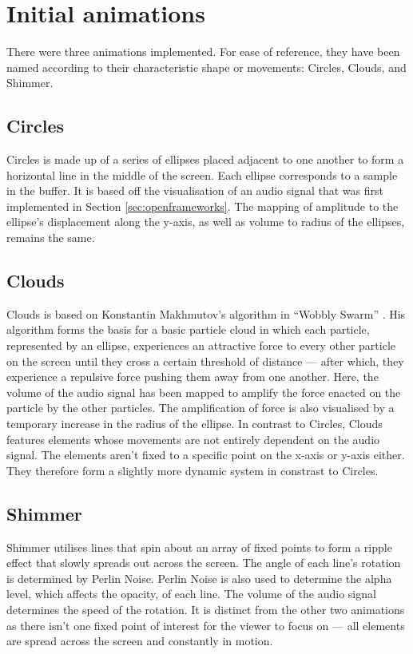 \documentclass[../initial_thesis.tex]{subfiles}
\begin{document}
\section{Initial animations}
There were three animations implemented. For ease of reference, they have been named according to their characteristic shape or movements: Circles, Clouds, and Shimmer.

\subsection{Circles}
Circles is made up of a series of ellipses placed adjacent to one another to form a horizontal line in the middle of the screen. Each ellipse corresponds to a sample in the buffer. It is based off the visualisation of an audio signal that was first implemented in Section \ref{sec:openframeworks}. The mapping of amplitude to the ellipse's displacement along the y-axis, as well as volume to radius of the ellipses, remains the same.

\subsection{Clouds}
Clouds is based on Konstantin Makhmutov's algorithm in ``Wobbly Swarm'' \cite{Makhmutov}. His algorithm forms the basis for a basic particle cloud in which each particle, represented by an ellipse, experiences an attractive force to every other particle on the screen until they cross a certain threshold of distance --- after which, they experience a repulsive force pushing them away from one another. Here, the volume of the audio signal has been mapped to amplify the force enacted on the particle by the other particles. The amplification of force is also visualised by a temporary increase in the radius of the ellipse. In contrast to Circles, Clouds features elements whose movements are not entirely dependent on the audio signal. The elements aren't fixed to a specific point on the x-axis or y-axis either. They therefore form a slightly more dynamic system in constrast to Circles.

\subsection{Shimmer}
Shimmer utilises lines that spin about an array of fixed points to form a ripple effect that slowly spreads out across the screen. The angle of each line's rotation is determined by Perlin Noise. Perlin Noise is also used to determine the alpha level, which affects the opacity, of each line. The volume of the audio signal determines the speed of the rotation. It is distinct from the other two animations as there isn't one fixed point of interest for the viewer to focus on --- all elements are spread across the screen and constantly in motion.
\end{document}
